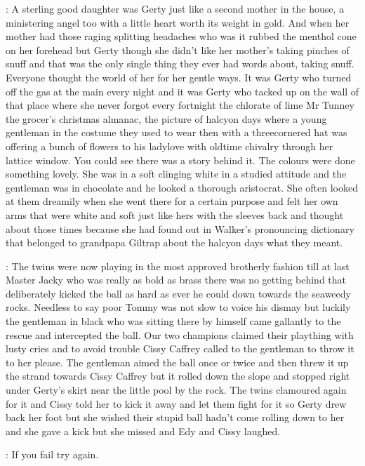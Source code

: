 :
A sterling good daughter was Gerty just like a second mother in the house,
a ministering angel too with a little heart worth its weight in gold.
And when her mother had those raging splitting headaches who was it
rubbed the menthol cone on her forehead but Gerty though she didn't like
her mother's taking pinches of snuff and that was the only single thing
they ever had words about, taking snuff. Everyone thought the world of her
for her gentle ways. It was Gerty who turned off the gas at the main every
night and it was Gerty who tacked up on the wall of that place where she
never forgot every fortnight the chlorate of lime Mr Tunney the grocer's
christmas almanac, the picture of halcyon days where a young gentleman in
the costume they used to wear then with a threecornered hat was offering a
bunch of flowers to his ladylove with oldtime chivalry through her lattice
window. You could see there was a story behind it. The colours were done
something lovely. She was in a soft clinging white in a studied attitude
and the gentleman was in chocolate and he looked a thorough aristocrat.
She often looked at them dreamily when she went there for a certain
purpose and felt her own arms that were white and soft just like hers with
the sleeves back and thought about those times because she had found out
in Walker's pronouncing dictionary that belonged to grandpapa Giltrap
about the halcyon days what they meant.

:
The twins were now playing in the most approved brotherly fashion till at
last Master Jacky who was really as bold as brass there was no getting
behind that deliberately kicked the ball as hard as ever he could down
towards the seaweedy rocks. Needless to say poor Tommy was not slow to
voice his dismay but luckily the gentleman in black who was sitting there
by himself came gallantly to the rescue and intercepted the ball. Our two
champions claimed their plaything with lusty cries and to avoid trouble
Cissy Caffrey called to the gentleman to throw it to her please. The
gentleman aimed the ball once or twice and then threw it up the strand
towards Cissy Caffrey but it rolled down the slope and stopped right under
Gerty's skirt near the little pool by the rock. The twins clamoured again
for it and Cissy told her to kick it away and let them fight for it so
Gerty drew back her foot but she wished their stupid ball hadn't come
rolling down to her and she gave a kick but she missed and Edy and Cissy
laughed.

\edy:
If you fail try again.

